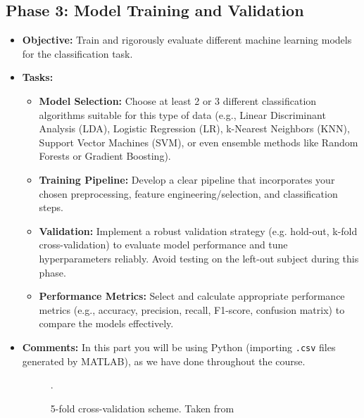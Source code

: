 \documentclass[11pt]{exam}
\begin{document}
    \subsection{Phase 3: Model Training and Validation} %
    \begin{itemize}
        \item \textbf{Objective:} Train and rigorously evaluate different machine learning models for the classification task.
        \item \textbf{Tasks:}
        \begin{itemize}
            \item \textbf{Model Selection:} Choose at least 2 or 3 different classification algorithms suitable for this type of data (e.g., Linear Discriminant Analysis (LDA), Logistic Regression (LR), k-Nearest Neighbors (KNN), Support Vector Machines (SVM), or even ensemble methods like Random Forests or Gradient Boosting).
            \item \textbf{Training Pipeline:} Develop a clear pipeline that incorporates your chosen preprocessing, feature engineering/selection, and classification steps.
            \item \textbf{Validation:} Implement a robust validation strategy (e.g. hold-out, k-fold cross-validation) to evaluate model performance and tune hyperparameters reliably. Avoid testing on the left-out subject during this phase.
            \item \textbf{Performance Metrics:} Select and calculate appropriate performance metrics (e.g., accuracy, precision, recall, F1-score, confusion matrix) to compare the models effectively.
        \end{itemize}
        \item \textbf{Comments:} In this part you will be using Python (importing \texttt{.csv} files generated by MATLAB), as we have done throughout the course.
        \begin{figure}[htbp]
            \centering
            \caption{5-fold cross-validation scheme. Taken from \href{https://www.datacamp.com/tutorial/k-fold-cross-validation}{}}.
        \end{figure}


\end{itemize}
\end{document}
